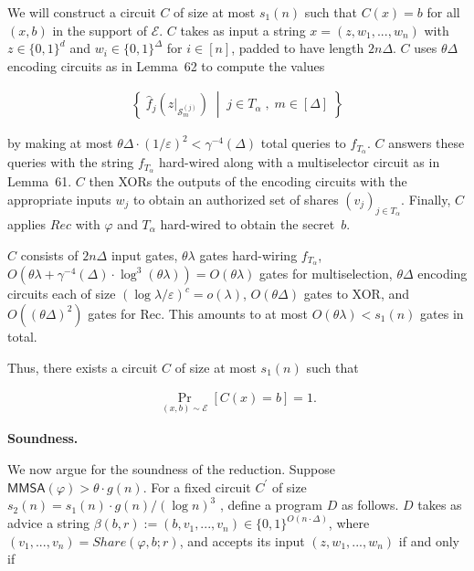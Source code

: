 We will construct a circuit $C$ of size at most $s_{1}(n)$ such that $C(x)=b$ for all $(x,b)$ in the support of $\mathcal{E}$. $C$ takes as input a string $x=(z,w_{1},...,w_{n})$ with $z\in\{0,1\}^{d}$ and $w_{i}\in\{0,1\}^{\Delta}$ for $i\in[n]$, padded to have length $2n\Delta$. $C$ uses $\theta\Delta$ encoding circuits as in Lemma 62 to compute the values\par


\[\begin{gathered}
\left\{\;\hat{f}_{j}\left(z|_{\mathcal{S}^{(j)}_{m}}\right)\;\middle|\;j\in T_{\alpha}\;,\;m\in[\Delta]\;\right\}
\end{gathered}\]


by making at most $\theta\Delta\cdot(1/\varepsilon)^{2}<\gamma^{-4}(\Delta)$ total queries to $f_{T_{\alpha}}$. $C$ answers these queries with the string $f_{T_{\alpha}}$ hard-wired along with a multiselector circuit as in Lemma 61. $C$ then XORs the outputs of the encoding circuits with the appropriate inputs $w_{j}$ to obtain an authorized set of shares $(v_{j})_{j\in T_{\alpha}}$. Finally, $C$ applies $Rec$ with $\varphi$ and $T_{\alpha}$ hard-wired to obtain the secret $b$.\par




$C$ consists of $2n\Delta$ input gates, $\theta\lambda$ gates hard-wiring $f_{T_{\alpha}}$, $O(\theta\lambda+\gamma^{-4}(\Delta)\cdot\log^{3}(\theta\lambda))=O(\theta\lambda)$ gates for multiselection, $\theta\Delta$ encoding circuits each of size $(\log\lambda/\varepsilon)^{c}=o(\lambda)$, $O(\theta\Delta)$ gates to XOR, and $O((\theta\Delta)^{2})$ gates for Rec. This amounts to at most $O(\theta\lambda)<s_{1}(n)$ gates in total.\par




Thus, there exists a circuit $C$ of size at most $s_{1}(n)$ such that\par


\[\begin{gathered}
\Pr_{(x,b)\sim\mathcal{E}}[C(x)=b]=1.
\end{gathered}\]





\par\medskip\noindent\textbf{Soundness.}\par




We now argue for the soundness of the reduction. Suppose ${\mathsf{MMSA}}(\varphi)>\theta\cdot g(n)$.
For a fixed circuit $C^{\prime}$ of size $s_{2}(n)=s_{1}(n)\cdot g(n)/(\log n)^{3}$ , define a program $D$ as follows. $D$ takes as advice a string $\beta(b,r):=(b,v_{1},...,v_{n})\in\{0,1\}^{O(n\cdot\Delta)}$, where $(v_{1},...,v_{n})=Share(\varphi,b;r)$, and accepts its input $(z,w_{1},...,w_{n})$ if and only if\par


